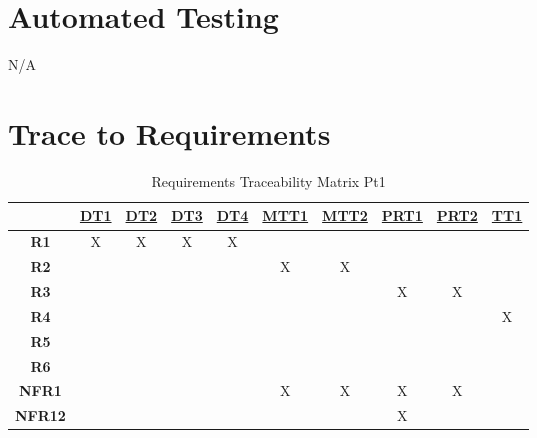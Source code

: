 \documentclass[12pt, titlepage]{article}
\begin{document}
\section{Automated Testing}
N/A

\section{Trace to Requirements}

\noindent
\begin{table}[H]
  \centering
  \begin{tabular}{|c|c|c|c|c|c|c|c|c|c|}
    \hline
                   & \hyperref[DT1]{DT1} & \hyperref[DT2]{DT2} & \hyperref[DT3]{DT3} & \hyperref[DT4]{DT4} & \hyperref[MTT1]{MTT1} & \hyperref[MTT2]{MTT2} & \hyperref[PRT1]{PRT1} & \hyperref[PRT2]{PRT2} & \hyperref[TT1]{TT1} \\
    \hline
    \textbf{R1}    & X                   & X                   & X                   & X                   &                       &                       &                       &                       &                     \\ \hline
    \textbf{R2}    &                     &                     &                     &                     & X                     & X                     &                       &                       &                     \\ \hline
    \textbf{R3}    &                     &                     &                     &                     &                       &                       & X                     & X                     &                     \\ \hline
    \textbf{R4}    &                     &                     &                     &                     &                       &                       &                       &                       & X                   \\ \hline
    \textbf{R5}    &                     &                     &                     &                     &                       &                       &                       &                       &                     \\ \hline
    \textbf{R6}    &                     &                     &                     &                     &                       &                       &                       &                       &                     \\ \hline
    \textbf{NFR1}  &                     &                     &                     &                     & X                     & X                     & X                     & X                     &                     \\ \hline
    \textbf{NFR12} &                     &                     &                     &                     &                       &                       & X                     &                       &                     \\ \hline
  \end{tabular}
  \caption{ Requirements Traceability Matrix Pt1}
  \label{Table:A_Req_trace}
\end{table}
\end{document}
